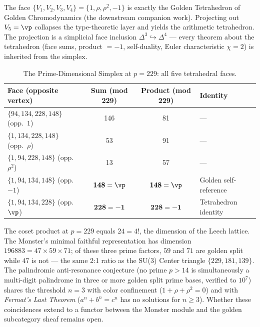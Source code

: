 \begin{corollary}\label{cor:projection}
The face $\{V_1, V_2, V_3, V_4\} = \{1, \rho, \rho^2, -1\}$ is exactly the Golden Tetrahedron of Golden Chromodynamics (the downstream companion work). Projecting out $V_5 = \vp$ collapses the type-theoretic layer and yields the arithmetic tetrahedron. The projection is a simplicial face inclusion $\Delta^3 \hookrightarrow \Delta^4$ --- every theorem about the tetrahedron (face sums, product $= -1$, self-duality, Euler characteristic $\chi = 2$) is inherited from the simplex.
\end{corollary}

\begin{table}[!ht]
\centering\small
\caption{The Prime-Dimensional Simplex at $p = 229$: all five tetrahedral faces.}
\begin{tabular}{@{}lccl@{}}
\toprule
\textbf{Face (opposite vertex)} & \textbf{Sum (mod 229)} & \textbf{Product (mod 229)} & \textbf{Identity} \\
\midrule
$\{94, 134, 228, 148\}$ (opp.\ $1$) & 146 & 81 & --- \\
$\{1, 134, 228, 148\}$ (opp.\ $\rho$) & 53 & 91 & --- \\
$\{1, 94, 228, 148\}$ (opp.\ $\rho^2$) & 13 & 57 & --- \\
$\{1, 94, 134, 148\}$ (opp.\ $-1$) & $\mathbf{148 = \vp}$ & $\mathbf{148 = \vp}$ & Golden self-reference \\
$\{1, 94, 134, 228\}$ (opp.\ $\vp$) & $\mathbf{228 = -1}$ & $\mathbf{228 = -1}$ & Tetrahedron identity \\
\bottomrule
\end{tabular}
\end{table}

\begin{remark}\label{rem:24-nexus}
The coset product at $p = 229$ equals $24 = 4!$, the dimension of the Leech lattice. The Monster's minimal faithful representation has dimension $196883 = 47 \times 59 \times 71$; of these three prime factors, $59$ and $71$ are golden split while $47$ is not --- the same 2:1 ratio as the SU(3) Center triangle $\{229, 181, 139\}$. The palindromic anti-resonance conjecture\label{conj:antires} (no prime $p > 14$ is simultaneously a multi-digit palindrome in three or more golden split prime bases, verified to $10^7$) shares the threshold $n = 3$ with color confinement ($1 + \rho + \rho^2 = 0$) and with \emph{Fermat's Last Theorem} ($a^n + b^n = c^n$ has no solutions for $n \geq 3$). Whether these coincidences extend to a functor between the Monster module and the golden subcategory sheaf remains open.
\end{remark}

